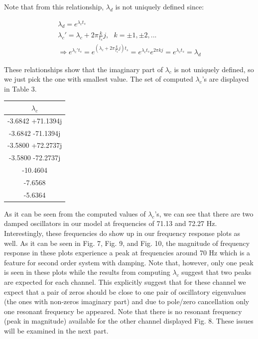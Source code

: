 \documentclass[paper=US leter, fontsize=11pt]{scrartcl}
\begin{document}
Note that from this relationship, $\lambda_{d}$ is not uniquely defined since: 

\begin{gather*}
\lambda_{d} = e^{\lambda_{c}t_{s}}\\
\lambda_{c}' = \lambda_{c} + 2\pi\frac{k}{t_{s}}j, \text{ }k = \pm1,\pm2,... \\ 
\Rightarrow e^{\lambda_{c}'t_{s}} = e^{(\lambda_{c}+2\pi\frac{k}{t_{s}}j)t_{s}} = e^{\lambda_{c}t_{s}}e^{2\pi kj} = e^{\lambda_{c}t_{s}} = \lambda_{d}
\tag{4}
\end{gather*} 


These relationships show that the imaginary part of $\lambda_{c}$ is not uniquely defined, so we just pick the one with smallest value. The set of computed $\lambda_{c}$'s are displayed in Table 3.

\begin{center} \label{eigH100}
	\vspace{10pt}
	\begin{tabular}{ |c| } 
		\hline
		$\lambda_{c}$ \\ 
		\hline
		  -3.6842 +71.1394j \\
		  \hline
		-3.6842 -71.1394j \\
		\hline
		-3.5800 +72.2737j \\
		\hline
		-3.5800 -72.2737j \\
		\hline
		-10.4604 \\
		\hline
		-7.6568 \\
		\hline
		-5.6364 \\ 
		\hline
	\end{tabular}
\end{center}

\vspace{20pt}
As it can be seen from the computed values of $\lambda_{c}$'s, we can see that there are two damped oscillators in our model at frequencies of 71.13 and 72.27 Hz. Interestingly, these frequencies do show up in our frequency response plots as well. As it can be seen in Fig. 7, Fig. 9, and Fig. 10, the magnitude of frequency response in these plots experience a peak at frequencies around 70 Hz which is a feature for second order system with damping. Note that, however, only one peak is seen in these plots while the results from computing $\lambda_{c}$ suggest that two peaks are expected for each channel. This explicitly suggest that for these channel we expect that a pair of zeros should be close to one pair of oscillatory eigenvalues (the ones with non-zeros imaginary part) and due to pole/zero cancellation only one resonant frequency be appeared. Note that there is no resonant frequency (peak in magnitude) available for the other channel displayed Fig. 8. These issues will be examined in the next part.
\end{document}
